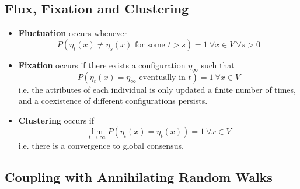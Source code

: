 \documentclass[
paper=128mm:96mm, %
fontsize=11pt, %
pagesize, %
parskip=half-, %
]{scrartcl} %
\theoremstyle{mythmstyle} %
\begin{document}
\clearpage 

\subsection{Flux, Fixation and Clustering}

\begin{itemize}
\item \textbf{Fluctuation} occurs whenever 
\begin{equation}
P(\eta_t(x) \neq \eta_s(x)\text{ for some } t>s ) = 1 \: \forall x\in V \: \forall s>0
\end{equation} 
\item \textbf{Fixation} occurs if there exists a configuration $\eta_{\infty}$ such that 
\begin{equation}
P(\eta_t(x) = \eta_{\infty} \text{ eventually in } t) = 1 \: \forall x\in V
\end{equation}
i.e. the attributes of each individual is only updated a finite number of times, and a coexistence of different configurations persists. \
\item \textbf{Clustering} occurs if
\begin{equation}
\lim_{t \rightarrow \infty} P(\eta_t(x) = \eta_{t}(x)) = 1 \: \forall x\in V
\end{equation}
i.e. there is a convergence to global consensus. \\
\end{itemize}

\clearpage 

\subsection{Coupling with Annihilating Random Walks}
\end{document}
